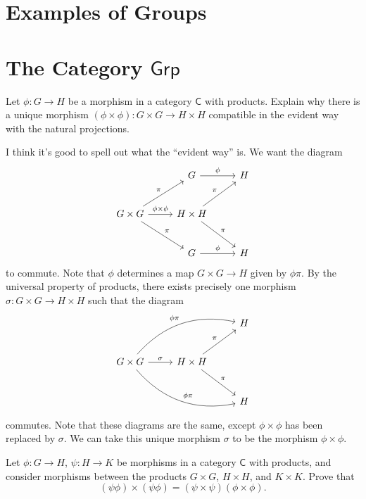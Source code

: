 \documentclass[11pt]{report}
\begin{document}
\section{Examples of Groups}
\section{The Category $\mathsf{Grp} $}
\begin{exercise}
	Let $\phi : G \to H$ be a morphism in a category $\mathsf{C} $ with products. Explain why there is a unique morphism $(\phi \times \phi ): G\times G \to H\times H$ compatible in the evident way with the natural projections.
\end{exercise}
\begin{solution}
	I think it's good to spell out what the ``evident way'' is. We want the diagram
	\[\begin{tikzcd}[row sep = 2.5em, column sep = 2.5em]
		&G\arrow[r, "\phi "]&H\\
		G\times G\arrow[ur, "\pi "]\arrow[dr, "\pi "]\arrow[r, "\phi \times \phi "]&H\times H\arrow[ru, "\pi "]\arrow[dr, "\pi "]\\
		&G\arrow[r, "\phi "]&H
	\end{tikzcd}\]
	to commute. Note that $\phi $ determines a map $G\times G\to H$ given by $\phi \pi $. By the universal property of products, there exists precisely one morphism $\sigma  : G\times G \to H\times H$ such that the diagram
	\[\begin{tikzcd}[row sep = 2.5em, column sep = 2.5em]
		&&H\\
		G\times G\arrow[r, "\sigma "]\arrow[rru, bend left, "\phi \pi "]\arrow[drr, bend right, "\phi \pi "]&H\times H\arrow[ur, "\pi "]\arrow[dr, "\pi "]\\
												       &&H
	\end{tikzcd}\]
	commutes. Note that these diagrams are the same, except $\phi \times \phi $ has been replaced by $\sigma $. We can take this unique morphism $\sigma $ to be the morphism $\phi \times \phi $.
\end{solution}
\begin{exercise}
	Let $\phi :G \to H$, $\psi: H \to K$ be morphisms in a category $\mathsf{C} $ with products, and consider morphisms between the products $G\times G$, $H\times H$, and $K\times K$. Prove that
	\[
		(\psi \phi )\times (\psi \phi  )=(\psi \times \psi )(\phi \times \phi )
	.\]
\end{exercise}
\end{document}
